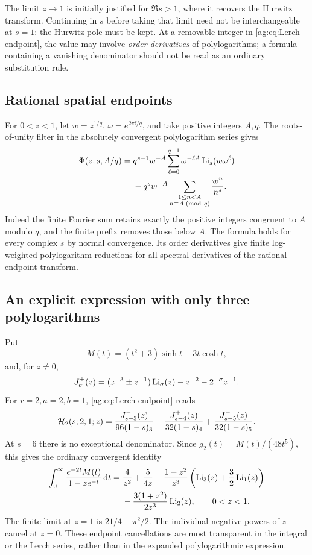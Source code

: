 The limit $z\to1$ is initially justified for $\Re s>1$, where it
recovers the Hurwitz transform. Continuing in $s$ before taking that
limit need not be interchangeable at $s=1$: the Hurwitz pole must be
kept. At a removable integer in \eqref{ag:eq:Lerch-endpoint}, the value
may involve \emph{order derivatives} of polylogarithms; a formula
containing a vanishing denominator should not be read as an ordinary
substitution rule.

\subsection{Rational spatial endpoints}
For $0<z<1$, let $w=z^{1/q}$, $\omega=e^{2\pi\ii/q}$, and take
positive integers $A,q$. The roots-of-unity filter in the absolutely
convergent polylogarithm series gives
\begin{align}
 \Phi(z,s,A/q)
 ={}&q^{s-1}w^{-A}\sum_{\ell=0}^{q-1}\omega^{-\ell A}
                                      \operatorname{Li}_s(w\omega^\ell)\notag\\
 &-q^sw^{-A}
       \sum_{\substack{1\le n<A\\n\equiv A\;({\rm mod}\ q)}}
                                    \frac{w^n}{n^s}.
 \label{ag:eq:rational-Lerch}
\end{align}
Indeed the finite Fourier sum retains exactly the positive integers
congruent to $A$ modulo $q$, and the finite prefix removes those below
$A$. The formula holds for every complex $s$ by normal convergence.
Its order derivatives give finite log-weighted polylogarithm reductions
for all spectral derivatives of the rational-endpoint transform.

\subsection{An explicit expression with only three polylogarithms}
Put
\[
 M(t)=(t^2+3)\sinh t-3t\cosh t,
\]
and, for $z\ne0$,
\[
 J_\sigma^\pm(z)=(z^{-3}\pm z^{-1})\operatorname{Li}_\sigma(z)
                                  -z^{-2}-2^{-\sigma}z^{-1}.
\]
For $r=2,a=2,b=1$, \eqref{ag:eq:Lerch-endpoint} reads
\begin{equation}\label{ag:eq:r2-Lerch}
 \mathcal H_2(s;2,1;z)=\frac{J_{s-3}^-(z)}{96(1-s)_3}
       -\frac{J_{s-4}^+(z)}{32(1-s)_4}
       +\frac{J_{s-5}^-(z)}{32(1-s)_5}.
\end{equation}
At $s=6$ there is no exceptional denominator. Since
$g_2(t)=M(t)/(48t^5)$, this gives the ordinary convergent identity
\begin{align}
 \int_0^\infty\frac{e^{-2t}M(t)}{1-ze^{-t}}\,\mathrm d t
 ={}&\frac4{z^2}+\frac5{4z}
 -\frac{1-z^2}{z^3}\left(\operatorname{Li}_3(z)+\frac32\operatorname{Li}_1(z)\right)\notag\\
 &-\frac{3(1+z^2)}{2z^3}\operatorname{Li}_2(z),\qquad 0<z<1.
 \label{ag:eq:three-polylogs}
\end{align}
The finite limit at $z=1$ is $21/4-\pi^2/2$. The individual negative
powers of $z$ cancel at $z=0$. These endpoint cancellations are most
transparent in the integral or the Lerch series, rather than in the
expanded polylogarithmic expression.
